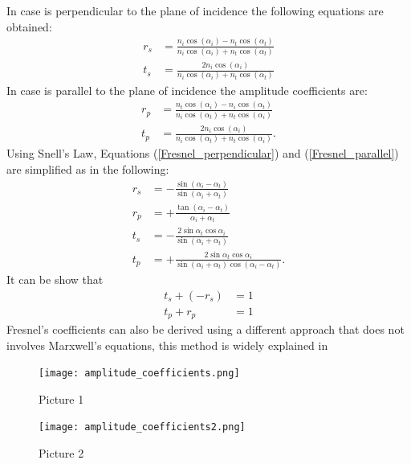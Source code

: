 In case  is perpendicular to the plane of incidence the following equations are obtained:
\begin{equation} \label{Fresnel_perpendicular}
\begin{split}
r_{s} & = \frac{n_i\cos(\alpha_i)-n_t \cos(\alpha_t)}{n_i \cos(\alpha_i)+n_t\cos(\alpha_t)}\\
t_{s} & =  \frac{2n_i\cos(\alpha_i)}{n_i\cos(\alpha_i)+n_t\cos(\alpha_t)}
\end{split}
\end{equation}
In case  is parallel to the plane of incidence the amplitude coefficients are:
\begin{equation}\label{Fresnel_parallel}
\begin{split}
r_{p} & = \frac{n_t\cos(\alpha_i)-n_i \cos(\alpha_t)}{n_i \cos(\alpha_t)+n_t\cos(\alpha_i)}\\
t_{p} & =  \frac{2n_i\cos(\alpha_i)}{n_i\cos(\alpha_t)+n_t\cos(\alpha_i)}.
\end{split}
\end{equation}
Using Snell's Law,  Equations (\ref{Fresnel_perpendicular}) and (\ref{Fresnel_parallel}) are simplified as in the following:
\begin{equation} \label{simple_Fresnel}
\begin{split}
r_{s} & = -\frac{\sin(\alpha_i-\alpha_t)}{\sin(\alpha_i+\alpha_t)}\\
r_{p} & =  +\frac{\tan(\alpha_i-\alpha_t)}{\alpha_i+\alpha_t}\\
t_{s} & = -\frac{2\sin \alpha_t \cos \alpha_i}{\sin(\alpha_i+\alpha_t)}\\
t_{p} & = +\frac{2\sin \alpha_t \cos \alpha_i}{\sin(\alpha_i+\alpha_t)\cos(\alpha_i- \alpha_t)}.
\end{split}
\end{equation}
It can be show that
 \begin{equation}
\begin{split}
t_s+(-r_s) &= 1 \\
t_p+r_p &=  1
\end{split}
\end{equation}
Fresnel's coefficients can also be derived using a different approach that does not involves Marxwell's equations, this method is widely explained in \cite{feynman2011feynman}
\begin{figure}[h]
  \begin{minipage}[h]{0.4\textwidth}
    \texttt{[image: amplitude\_coefficients.png]}
    \caption{Picture 1}
    \label{fig:1}
  \end{minipage}
  \begin{minipage}[h]{0.4\textwidth}
    \texttt{[image: amplitude\_coefficients2.png]}
    \caption{Picture 2}
   \label{fig:2}
 \end{minipage}
\end{figure}

